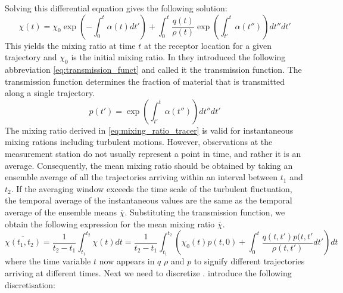 Solving this differential equation gives the following solution:
\begin{equation}\label{eq:mixing_ratio_tracer}
    \chi(t) = \chi_0 \exp{\left(-\int_0^t \alpha(t)dt'\right)} + \int_0^t \frac{q(t)}{\rho(t)}\exp{\left(\int_{t'}^t\alpha(t'')\right)dt''}dt'
\end{equation}
This yields the mixing ratio at time $t$ at the receptor location for a given trajectory and $\chi_0$ is the initial mixing ratio. In \parencite{seibert2004source} they introduced the following abbreviation \cref{eq:transmission_funct} and called it the transmission function. The transmission function determines the fraction of material that is transmitted along a single trajectory.   
\begin{equation}\label{eq:transmission_funct}
    p(t') = \exp{\left(\int_{t'}^t\alpha(t'')\right)dt''}dt'
\end{equation} 
The mixing ratio derived in \cref{eq:mixing_ratio_tracer} is valid for instantaneous mixing rations including turbulent motions. However, observations at the measurement station do not usually represent a point in time, and rather it is an average. Consequently, the mean mixing ratio should be obtained by taking an ensemble average of all the trajectories arriving within an interval between $t_1$ and $t_2$. If the averaging window exceeds the time scale of the turbulent fluctuation, the temporal average of the instantaneous values are the same as the temporal average of the ensemble means $\overline{\chi}$. Substituting the transmission function, we obtain the following expression for the mean mixing ratio $\overline{\chi}$. 
\begin{equation}\label{eq:ensemble_mix_ratio}
    \overline{\chi(t_1, t_2)} = \frac{1}{t_2-t_1}\int_{t_1}^{t_2} \chi(t)dt = \frac{1}{t_2-t_1}\int_{t_1}^{t_2} \left(\chi_0(t)p(t,0)+\int_0^t \frac{q(t,t')p(t,t'}{\rho(t,t')}dt'\right)dt
\end{equation}
where the time variable $t$ now appears in $q$ $\rho$ and $p$ to signify different trajectories arriving at different times. Next we need to discretize . \textcite{seibert2004source} introduce the following discretisation:

